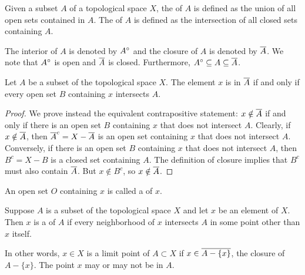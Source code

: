 \begin{definition}
Given a subset $A$ of a topological space $X$, the  of $A$ is defined as the union of all open sets contained in $A$.
The  of $A$ is defined as the intersection of all closed sets containing $A$.
\end{definition}

The interior of $A$ is denoted by ${A}^{\circ}$ and the closure of $A$ is denoted by $\overline{A}$.
We note that ${A}^{\circ}$ is open and $\overline{A}$ is closed.
Furthermore, ${A}^{\circ} \subseteq A \subseteq \overline{A}$.

\begin{theorem} \label{theorem:ClosureConditions}
Let $A$ be a subset of the topological space $X$.
The element $x$ is in $\overline{A}$ if and only if every open set $B$ containing $x$ intersects $A$.
\end{theorem}
\begin{proof}
We prove instead the equivalent contrapositive statement: $x \notin \overline{A}$ if and only if there is an open set $B$ containing $x$ that does not intersect $A$.
Clearly, if  $x \notin \overline{A}$, then $\overline{A}^c = X - \overline{A}$ is an open set containing $x$ that does not intersect $A$.
Conversely, if there is an open set $B$ containing $x$ that does not intersect $A$, then $B^c = X-B$ is a closed set containing $A$.
The definition of closure implies that $B^c$ must also contain $\overline{A}$.
But $x \notin B^c$, so $x\notin \overline{A}$.
\end{proof}

\begin{definition}
An open set $O$ containing $x$ is called a  of $x$.
\end{definition}

\begin{definition}
Suppose $A$ is a subset of the topological space $X$ and let $x$ be an element of $X$.
Then $x$ is a  of $A$ if every neighborhood of $x$ intersects $A$ in some point other than $x$ itself.
\end{definition}

In other words, $x \in X$ is a limit point of $A \subset X$ if $x \in \overline{A - \{ x \}}$, the closure of $A - \{ x \}$.
The point $x$ may or may not be in $A$.

